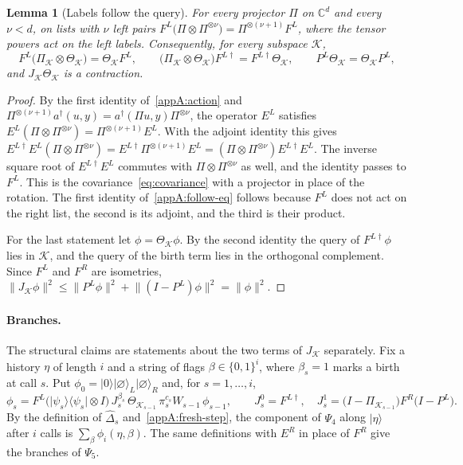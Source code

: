 \documentclass[11pt,letterpaper]{article}
\newtheorem{lemma}[theorem]{Lemma}
\theoremstyle{definition}\newtheorem{definition}[theorem]{Definition}
\newcommand{\C}{\mathbb C}
\newcommand{\ket}[1]{\lvert#1\rangle}
\newcommand{\bra}[1]{\langle#1\rvert}
\newcommand{\proj}[1]{\ket{#1}\!\bra{#1}}
\newcommand{\norm}[1]{\lVert#1\rVert}
\begin{document}
\begin{lemma}[Labels follow the query]\label{appA:follow}
For every projector $\Pi$ on $\C^d$ and every $\nu<d$, on lists with
$\nu$ left pairs
$F^L\bigl(\Pi\otimes\Pi^{\otimes\nu}\bigr)=\Pi^{\otimes(\nu+1)}F^L$,
where the tensor powers act on the left labels. Consequently, for
every subspace $\mathcal K$,
\begin{equation}\label{appA:follow-eq}
 F^L\bigl(\Pi_{\mathcal K}\otimes\Theta_{\mathcal K}\bigr)
   =\Theta_{\mathcal K}F^L,\qquad
 \bigl(\Pi_{\mathcal K}\otimes\Theta_{\mathcal K}\bigr)F^{L\dagger}
   =F^{L\dagger}\Theta_{\mathcal K},\qquad
 P^L\Theta_{\mathcal K}=\Theta_{\mathcal K}P^L ,
\end{equation}
and $J_{\mathcal K}\Theta_{\mathcal K}$ is a contraction.
\end{lemma}

\begin{proof}
By the first identity of~\eqref{appA:action} and
$\Pi^{\otimes(\nu+1)}a^\dagger(u,y)=a^\dagger(\Pi u,y)\Pi^{\otimes\nu}$,
the operator $E^L$ satisfies
$E^L(\Pi\otimes\Pi^{\otimes\nu})=\Pi^{\otimes(\nu+1)}E^L$. With the
adjoint identity this gives
$E^{L\dagger}E^L(\Pi\otimes\Pi^{\otimes\nu})
=E^{L\dagger}\Pi^{\otimes(\nu+1)}E^L
=(\Pi\otimes\Pi^{\otimes\nu})E^{L\dagger}E^L$. The inverse square root
of $E^{L\dagger}E^L$ commutes with $\Pi\otimes\Pi^{\otimes\nu}$ as
well, and the identity passes to $F^L$. This is the
covariance~\eqref{eq:covariance} with a
projector in place of the rotation. The first identity
of~\eqref{appA:follow-eq} follows because $F^L$ does not act on the
right list, the second is its adjoint, and the third is their product.

For the last statement let $\phi=\Theta_{\mathcal K}\phi$. By the
second identity the query of $F^{L\dagger}\phi$ lies in $\mathcal K$,
and the query of the birth term lies in the orthogonal complement.
Since $F^L$ and $F^R$ are isometries,
$\norm{J_{\mathcal K}\phi}^2\le\norm{P^L\phi}^2+\norm{(I-P^L)\phi}^2
=\norm\phi^2$.
\end{proof}

\paragraph{Branches.}
The structural claims are statements about the two terms of
$J_{\mathcal K}$ separately. Fix a history $\eta$ of length $i$ and a
string of flags $\beta\in\{0,1\}^i$, where $\beta_s=1$ marks a birth
at call $s$. Put $\phi_0=\ket0\ket\varnothing_L\ket\varnothing_R$ and,
for $s=1,\dots,i$,
\begin{equation}\label{appA:branches}
 \phi_s=F^L\bigl(\proj{\psi_s}\otimes I\bigr)\,J^{\beta_s}_s\,
   \Theta_{\mathcal K_{s-1}}\,\pi^{c_s}_sW_{s-1}\,\phi_{s-1},
 \qquad
 J^0_s=F^{L\dagger},\quad
 J^1_s=\bigl(I-\Pi_{\mathcal K_{s-1}}\bigr)F^R\bigl(I-P^L\bigr).
\end{equation}
By the definition of $\widehat\Delta_s$
and~\eqref{appA:fresh-step}, the component of $\Psi_4$ along
$\ket\eta$ after $i$ calls is $\sum_\beta\phi_i(\eta,\beta)$. The
same definitions with $E^R$ in place of $F^R$ give the branches of
$\Psi_5$.
\end{document}
